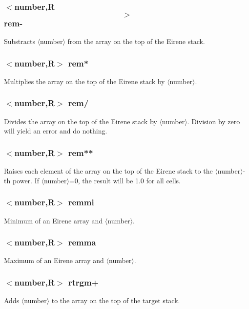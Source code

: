 \documentclass[a4paper,10pt]{report}
\begin{document}
\subsubsection{$<$number,{\bf R}$$>$$ rem-}\label{sec:rem-}
Substracts $\langle$number$\rangle$ from the array on the top of the Eirene stack.

\subsubsection{$<$number,{\bf R}$>$ rem*}\label{sec:rem*}
Multiplies the array on the top of the Eirene stack by $\langle$number$\rangle$.

\subsubsection{$<$number,{\bf R}$>$ rem/}\label{sec:rem/}
Divides the array on the top of the Eirene stack by $\langle$number$\rangle$. Division by
zero will yield an error and do nothing.

\subsubsection{$<$number,{\bf R}$>$ rem**}\label{sec:rem**}
Raises each element of the array on the top of the Eirene stack to the $\langle$number$\rangle$-th power. If $\langle$number$\rangle$=0, the result will be 1.0 for all cells.

\subsubsection{$<$number,{\bf R}$>$ remmi}\label{sec:remmi}
Minimum of an Eirene array and $\langle$number$\rangle$.

\subsubsection{$<$number,{\bf R}$>$ remma}\label{sec:remma}
Maximum of an Eirene array and $\langle$number$\rangle$.

\subsubsection{$<$number,{\bf R}$>$ rtrgm+}\label{sec:rtrgm+}
Adds $\langle$number$\rangle$ to the array on the top of the target stack.
\end{document}
